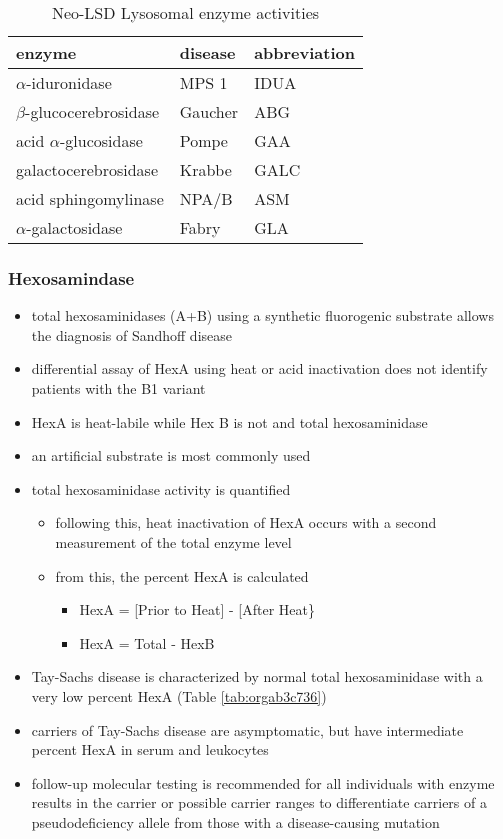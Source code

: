 \documentclass[12pt]{scrartcl}
\begin{document}
\begin{table}[htbp]
\caption{\label{tab:org214f9a3}Neo-LSD Lysosomal enzyme activities}
\centering
\begin{tabular}{lll}
enzyme & disease & abbreviation\\
\hline
\(\alpha\)-iduronidase & MPS 1 & IDUA\\
\(\beta\)-glucocerebrosidase & Gaucher & ABG\\
acid \(\alpha\)-glucosidase & Pompe & GAA\\
galactocerebrosidase & Krabbe & GALC\\
acid sphingomylinase & NPA/B & ASM\\
\(\alpha\)-galactosidase & Fabry & GLA\\
\end{tabular}
\end{table}

\subsubsection{Hexosamindase}
\label{sec:org5b3c959}
\begin{itemize}
\item total hexosaminidases (A+B) using a synthetic fluorogenic substrate
allows the diagnosis of Sandhoff disease
\item differential assay of HexA using heat or acid
inactivation does not identify patients with the B1 variant
\item HexA is heat-labile while Hex B is not and total hexosaminidase
\item an artificial substrate is most commonly used
\item total hexosaminidase activity is quantified
\begin{itemize}
\item following this, heat inactivation of HexA occurs with a second
measurement of the total enzyme level
\item from this, the percent HexA is calculated
\begin{itemize}
\item HexA = [Prior to Heat] - [After Heat\}
\item HexA = Total - HexB
\end{itemize}
\end{itemize}
\item Tay-Sachs disease is characterized by normal total hexosaminidase
with a very low percent HexA (Table \ref{tab:orgab3c736})
\item carriers of Tay-Sachs disease are asymptomatic, but have
intermediate percent HexA in serum and leukocytes
\item follow-up molecular testing is recommended for all individuals with
enzyme results in the carrier or possible carrier ranges to
differentiate carriers of a pseudodeficiency allele from those with
a disease-causing mutation
\end{itemize}
\end{document}
